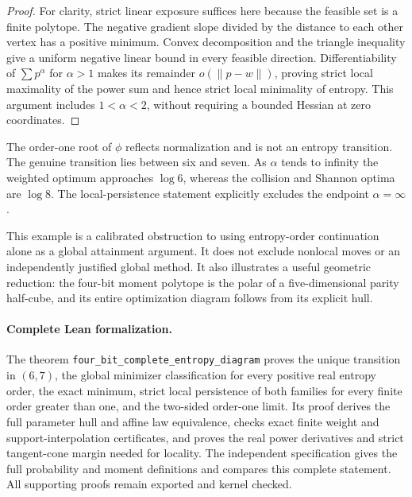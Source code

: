 \begin{proof}
For clarity, strict linear exposure suffices here because the feasible
set is a finite polytope. The negative gradient slope divided by the
distance to each other vertex has a positive minimum. Convex
decomposition and the triangle inequality give a uniform negative
linear bound in every feasible direction. Differentiability of
$\sum p^\alpha$ for $\alpha>1$ makes its remainder $o(\|p-w\|)$,
proving strict local maximality of the power sum and hence strict
local minimality of entropy. This argument includes $1<\alpha<2$,
without requiring a bounded Hessian at zero coordinates.
\end{proof}

The order-one root of $\phi$ reflects normalization and is not an
entropy transition. The genuine transition lies between six and seven.
As $\alpha$ tends to infinity the weighted optimum approaches
$\log6$, whereas the collision and Shannon optima are $\log8$.
The local-persistence statement explicitly excludes the endpoint
$\alpha=\infty$.

This example is a calibrated obstruction to using entropy-order
continuation alone as a global attainment argument. It does not
exclude nonlocal moves or an independently justified global method.
It also illustrates a useful geometric reduction: the four-bit
moment polytope is the polar of a five-dimensional parity half-cube,
and its entire optimization diagram follows from its explicit hull.

\paragraph{Complete Lean formalization.} The theorem \texttt{four\_\allowbreak bit\_\allowbreak complete\_\allowbreak entropy\_\allowbreak diagram} proves the unique transition in $(6,7)$, the global minimizer classification for every positive real entropy order, the exact minimum, strict local persistence of both families for every finite order greater than one, and the two-sided order-one limit. Its proof derives the full parameter hull and affine law equivalence, checks exact finite weight and support-interpolation certificates, and proves the real power derivatives and strict tangent-cone margin needed for locality. The independent specification gives the full probability and moment definitions and compares this complete statement. All supporting proofs remain exported and kernel checked.
